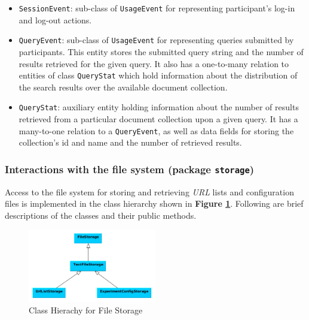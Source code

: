 \documentclass[a4paper]{usiinfbachelorproject}
\begin{document}
\begin{description}
\begin{itemize}
                \item \texttt{SessionEvent}: sub-class of \texttt{UsageEvent} for representing participant's log-in and log-out  
                    actions.

                \item \texttt{QueryEvent}: sub-class of \texttt{UsageEvent} for representing queries submitted by participants.
                    This entity stores the submitted query string and the number of results retrieved for the given query.
                    It also has a one-to-many relation to entities of class \texttt{QueryStat} which hold information about the 
                    distribution of the search results over the available document collection. 

                \item \texttt{QueryStat}: auxiliary entity holding information about the number of results retrieved from a particular
                    document collection upon a given query. It has a many-to-one relation to a \texttt{QueryEvent}, as well as data fields
                    for storing the collection's id and name and the number of retrieved results. 

            \end{itemize}


    \end{description}

\subsubsection{\textbf{Interactions with the file system (package \texttt{storage})}} \label{sec:archDataLayerStorage}

Access to the file system for storing and retrieving \emph{URL} lists and configuration files is implemented in the class
hierarchy shown in \textbf{Figure \ref{fig:storage}}. Following are brief descriptions of the classes and their
public methods.

\begin{figure}[h!]
\centering
\includegraphics[width=0.5\textwidth]{figures/storage}
\caption{Class Hierachy for File Storage}
\label{fig:storage}
\end{figure}
\end{document}
